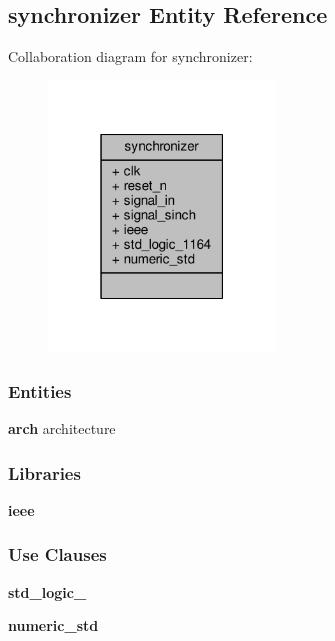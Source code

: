 \subsection{synchronizer Entity Reference}
\label{classsynchronizer}


Collaboration diagram for synchronizer\+:\nopagebreak
\begin{figure}[H]
\begin{center}
\leavevmode
\includegraphics[width=171pt]{df/dff/classsynchronizer__coll__graph}
\end{center}
\end{figure}
\subsubsection*{Entities}
\begin{DoxyCompactItemize}
\item 
{\bf arch} architecture
\end{DoxyCompactItemize}
\subsubsection*{Libraries}
 \begin{DoxyCompactItemize}
\item 
{\bf ieee} 
\end{DoxyCompactItemize}
\subsubsection*{Use Clauses}
 \begin{DoxyCompactItemize}
\item 
{\bf std\+\_\+logic\+\_}   
\item 
{\bf numeric\+\_\+std}   
\end{DoxyCompactItemize}
